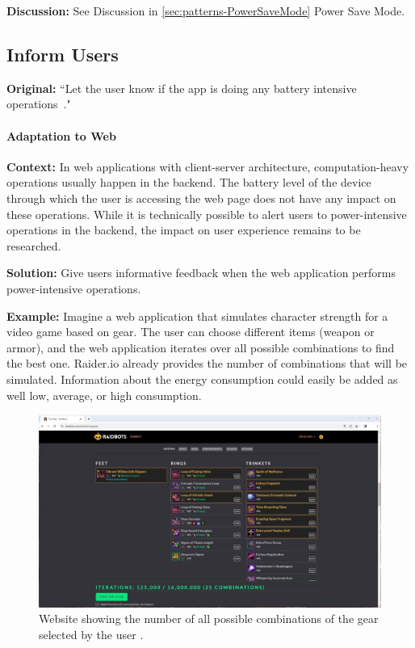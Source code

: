 \textbf{Discussion:} See Discussion in \ref{sec:patterns-PowerSaveMode} Power Save Mode.


\subsection{Inform Users} \label{sec:patterns-InformUsers}
\textbf{Original:} ``Let the user know if the app is doing any battery intensive operations~\cite{cruz2019catalog}."

\paragraph{Adaptation to Web}\mbox{}

\textbf{Context:} In web applications with client-server architecture, computation-heavy operations usually happen in the backend. The battery level of the device through which the user is accessing the web page does not have any impact on these operations. While it is technically possible to alert users to power-intensive operations in the backend, the impact on user experience remains to be researched.

\textbf{Solution:} Give users informative feedback when the web application performs power-intensive operations.

\textbf{Example:} Imagine a web application that simulates character strength for a video game based on gear. The user can choose different items (\ie weapon or armor), and the web application iterates over all possible combinations to find the best one. Raider.io \cite{raider_iO_website} already provides the number of combinations that will be simulated. Information about the energy consumption could easily be added as well \eg low, average, or high consumption. 


\begin{figure}
    \centering
    \includegraphics[width=\linewidth]{RQ1/Img/Raidbots.jpg}
    \caption{Website showing the number of all possible combinations of the gear selected by the user \cite{raider_iO_website}.}
    \label{fig:raidbots}
\end{figure}


